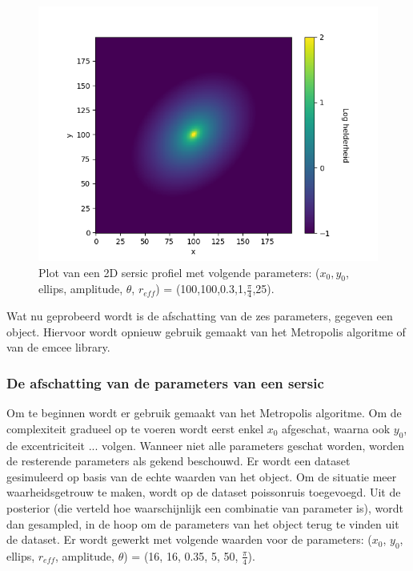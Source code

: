 \begin{figure}
    \centering
    \includegraphics[width=0.95\linewidth]{Figures/figuur_2D_zonder_package_1_25_8_0.3_0.7853981633974483.png}
    \caption{Plot van een 2D sersic profiel met volgende parameters: ($x_0, y_0$, ellips, amplitude, $\theta$, $r_{eff}$) = (100,100,0.3,1,$\frac{\pi}{4}$,25).}
    \label{fig: 2D_sersic}
\end{figure}
Wat nu geprobeerd wordt is de afschatting van de zes parameters, gegeven een object. Hiervoor wordt opnieuw gebruik gemaakt van het Metropolis algoritme of van de emcee library. 
\subsubsection{De afschatting van de parameters van een sersic}
Om te beginnen wordt er gebruik gemaakt van het Metropolis algoritme. Om de complexiteit gradueel op te voeren wordt eerst enkel $x_{0}$ afgeschat, waarna ook $y_{0}$, de excentriciteit ... volgen. Wanneer niet alle parameters geschat worden, worden de resterende parameters als gekend beschouwd. Er wordt een dataset gesimuleerd op basis van de echte waarden van het object. Om de situatie meer waarheidsgetrouw te maken, wordt op de dataset poissonruis toegevoegd. Uit de posterior (die verteld hoe waarschijnlijk een combinatie van parameter is), wordt dan gesampled, in de hoop om de parameters van het object terug te vinden uit de dataset.
Er wordt gewerkt met volgende waarden voor de parameters: ($x_0$, $y_0$, ellips, $r_{eff}$, amplitude, $\theta$) = (16, 16, 0.35, 5, 50, $\frac{\pi}{4}$). \\ \\

